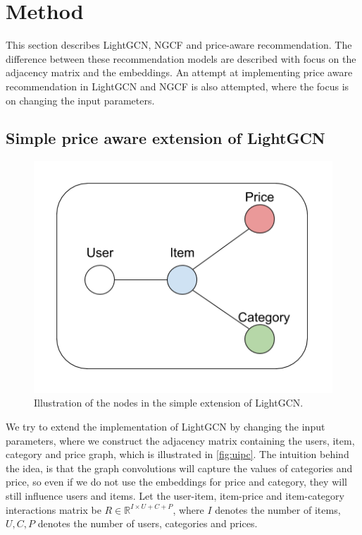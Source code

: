 \section{Method}
This section describes LightGCN, NGCF and price-aware recommendation.
The difference between these recommendation models are described with focus on the adjacency matrix and the embeddings.
An attempt at implementing price aware recommendation in LightGCN and NGCF is also attempted, where the focus is on changing the input parameters.





\subsection{Simple price aware extension of LightGCN}\label{subsec:simple-extension}
\begin{figure}
    \centering
    \includegraphics[scale=0.5]{figures/uipc.png}
    \caption{Illustration of the nodes in the simple extension of LightGCN.}
    \label{fig:uipc}
\end{figure}
We try to extend the implementation of LightGCN by changing the input parameters, where we construct the adjacency matrix containing the users, item, category and price graph, which is illustrated in \autoref{fig:uipc}.
The intuition behind the idea, is that the graph convolutions will capture the values of categories and price, so even if we do not use the embeddings for price and category, they will still influence users and items.
Let the user-item, item-price and item-category interactions matrix be $R \in \mathbb{R}^{I \times U + C + P}$, where $I$ denotes the number of items, $U, C, P$ denotes the number of users, categories and prices.
